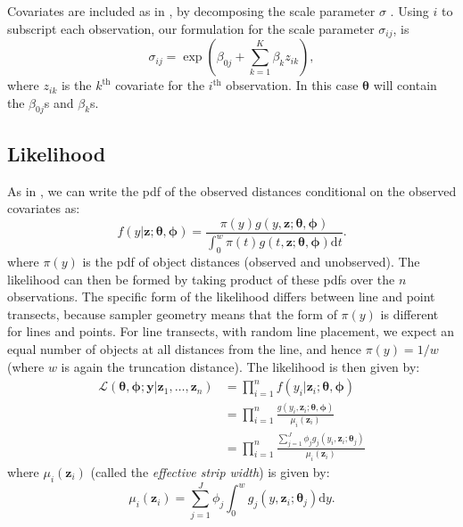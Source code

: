 \documentclass[authoryear,preprint,review,12pt]{elsarticle}
\begin{document}
Covariates are included as in \cite{Marques:2003vb}, by decomposing the scale parameter $\sigma$ \cite[see also][]{Marques:2007vm}.  Using $i$ to subscript each observation, our formulation for the scale parameter $\sigma_{ij}$, is
\begin{equation*}
\sigma_{ij} = \exp( \beta_{0j} + \sum_{k=1}^K \beta_k z_{ik}),
\end{equation*}
where $z_{ik}$ is the $k^\text{th}$ covariate for the $i^\text{th}$ observation. In this case $\bm{\theta}$ will contain the $\beta_{0j}$s and $\beta_k$s.

\subsection{Likelihood}
\label{s:likelihood}

As in \cite{Buckland:2004ts}, we can write the pdf of the observed distances conditional on the observed covariates as:
\begin{equation*}
f(y \vert \bm{z}; \bm{\theta}, \bm{\phi}) = \frac{\pi(y)g(y, \bm{z}; \bm{\theta}, \bm{\phi})}{\int_0^w \pi(t)g(t, \bm{z}; \bm{\theta}, \bm{\phi}) \text{d}t}.
\end{equation*}
where $\pi(y)$ is the pdf of object distances (observed and unobserved). The likelihood can then be formed by taking product of these pdfs over the $n$ observations.  The specific form of the likelihood differs between line and point transects, because sampler geometry means that the form of $\pi(y)$ is different for lines and points.  For line transects, with random line placement, we expect an equal number of objects at all distances from the line, and hence $\pi(y)=1/w$ (where $w$ is again the truncation distance).  The likelihood is then given by:
\begin{align*}
\mathcal{L}(\bm{\theta},\bm{\phi}; \mathbf{y} \vert \bm{z}_1, \ldots, \bm{z}_n) &= \prod_{i=1}^n f(y_i \vert \bm{z}_i; \bm{\theta},\bm{\phi})\\
&= \prod_{i=1}^n \frac{g(y_i,\bm{z}_i; \bm{\theta},\bm{\phi})}{\mu_i(\bm{z}_i)}\\
&= \prod_{i=1}^n \frac{\sum_{j=1}^J \phi_j g_j(y_i,\bm{z}_i; \bm{\theta}_j)}{\mu_i(\bm{z}_i)}
\end{align*}
where $\mu_i(\bm{z}_i)$ (called the \textit{effective strip width}) is given by:
\begin{equation}
\label{e:esw}
\mu_{i}(\bm{z}_i) = \sum_{j=1}^J \phi_j \int_0^w  g_j(y,\bm{z}_i; \bm{\theta}_j) \text{d}y.
\end{equation}
\end{document}
